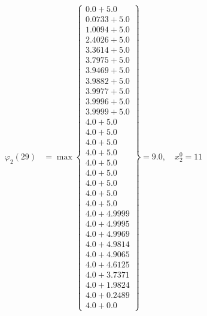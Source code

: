 \documentclass{article}
\begin{document}
\begin{align*}
\varphi_{2}(29) &= \max \left\{ \begin{array}{c}
0.0 + 5.0 \\
 0.0733 + 5.0 \\
 1.0094 + 5.0 \\
 2.4026 + 5.0 \\
 3.3614 + 5.0 \\
 3.7975 + 5.0 \\
 3.9469 + 5.0 \\
 3.9882 + 5.0 \\
 3.9977 + 5.0 \\
 3.9996 + 5.0 \\
 3.9999 + 5.0 \\
 4.0 + 5.0 \\
 4.0 + 5.0 \\
 4.0 + 5.0 \\
 4.0 + 5.0 \\
 4.0 + 5.0 \\
 4.0 + 5.0 \\
 4.0 + 5.0 \\
 4.0 + 5.0 \\
 4.0 + 5.0 \\
 4.0 + 4.9999 \\
 4.0 + 4.9995 \\
 4.0 + 4.9969 \\
 4.0 + 4.9814 \\
 4.0 + 4.9065 \\
 4.0 + 4.6125 \\
 4.0 + 3.7371 \\
 4.0 + 1.9824 \\
 4.0 + 0.2489 \\
 4.0 + 0.0
\end{array} \right\}=9.0, \quad x_{2}^0=11\\
  

\end{align*}
\end{document}
